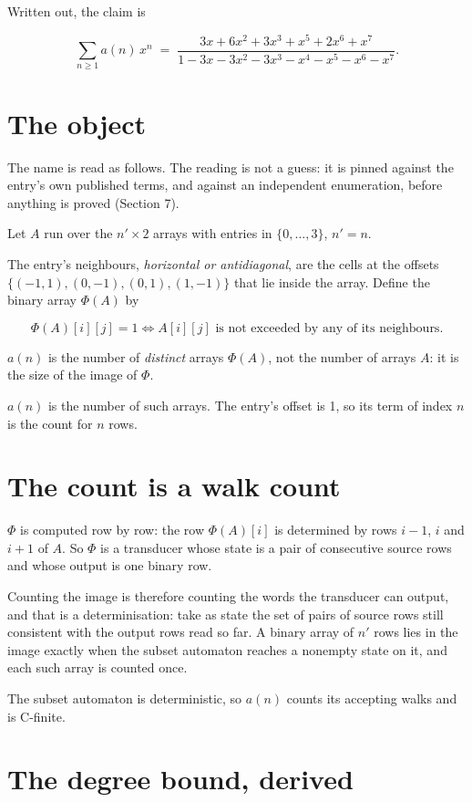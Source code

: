 \documentclass[11pt]{article}
\theoremstyle{definition}
\begin{document}
Written out, the claim is

\[\sum_{n \ge 1} a(n)\,x^n \;=\; \frac{3x + 6x^{2} + 3x^{3} + x^{5} + 2x^{6} + x^{7}}{1 - 3x - 3x^{2} - 3x^{3} - x^{4} - x^{5} - x^{6} - x^{7}}.\]

\section{The object}

The name is read as follows. The reading is not a guess: it is pinned against the entry's own published terms, and against an independent enumeration, before anything is proved (Section 7).

Let $A$ run over the $n' \times 2$ arrays with entries in $\{0,\dots,3\}$, $n' = n$.

The entry's neighbours, {\itshape horizontal or antidiagonal}, are the cells at the offsets $\{(-1,1), (0,-1), (0,1), (1,-1)\}$ that lie inside the array. Define the binary array $\Phi(A)$ by

\[\Phi(A)[i][j] = 1 \iff A[i][j] \text{ is not exceeded by any of its neighbours}.\]

$a(n)$ is the number of {\itshape distinct} arrays $\Phi(A)$, not the number of arrays $A$: it is the size of the image of $\Phi$.

$a(n)$ is the number of such arrays. The entry's offset is 1, so its term of index $n$ is the count for $n$ rows.

\section{The count is a walk count}

$\Phi$ is computed row by row: the row $\Phi(A)[i]$ is determined by rows $i-1$, $i$ and $i+1$ of $A$. So $\Phi$ is a transducer whose state is a pair of consecutive source rows and whose output is one binary row.

Counting the image is therefore counting the words the transducer can output, and that is a determinisation: take as state the set of pairs of source rows still consistent with the output rows read so far. A binary array of $n'$ rows lies in the image exactly when the subset automaton reaches a nonempty state on it, and each such array is counted once.

The subset automaton is deterministic, so $a(n)$ counts its accepting walks and is C-finite.

\section{The degree bound, derived}
\end{document}
